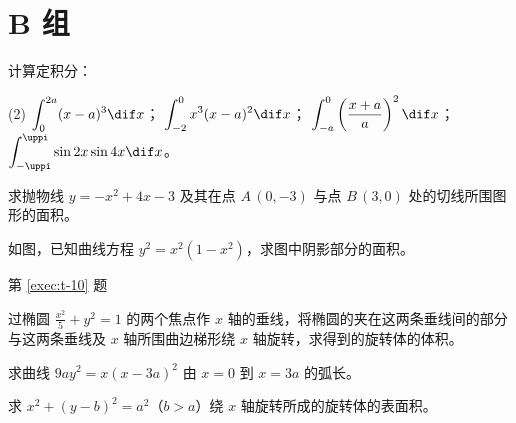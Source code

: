 \section*{B 组}
\begin{question}[resume]
  \item 计算定积分：
  \begin{tasks}(2)
    \task $\displaystyle \int_0^{2a} (x-a)^3 \dif x$；
    \task $\displaystyle \int_{-2}^{0} x^3(x-a)^2 \dif x$；
    \task $\displaystyle \int_{-a}^{0} \left(\frac{x+a}{a}\right)^2 \dif x$；
    \task $\displaystyle \int_{-\uppi}^{\uppi} \sin 2x\sin 4x \dif x$。
  \end{tasks}
  \item 求抛物线 $y=-x^2+4x-3$ 及其在点 $A\,(0,-3)$ 与点 $B\,(3,0)$ 处的切线所围图形的面积。
  \item \label{exec:t-10}如图，已知曲线方程 $y^2=x^2(1-x^2)$，求图中阴影部分的面积。
  \begin{figurehere}
    \begin{minipage}{\linewidth}\centering
      \caption*{第 \ref{exec:t-10} 题}
    \end{minipage}
  \end{figurehere}
  \item 过椭圆 $\frac{x^2}{5}+y^2=1$ 的两个焦点作 $x$ 轴的垂线，将椭圆的夹在这两条垂线间的部分与这两条垂线及 $x$ 轴所围曲边梯形绕 $x$ 轴旋转，求得到的旋转体的体积。
  \item 求曲线 $9ay^2=x(x-3a)^2$ 由 $x=0$ 到 $x=3a$ 的弧长。
  \item 求 $x^2+(y-b)^2=a^2$（$b>a$）绕 $x$ 轴旋转所成的旋转体的表面积。
\end{question}